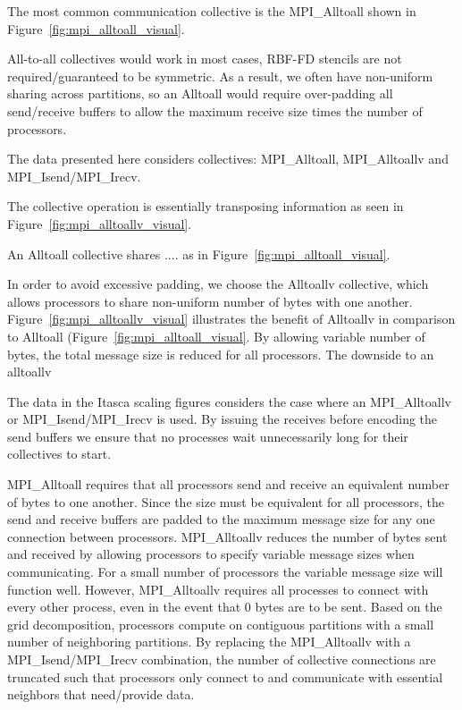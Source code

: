 \documentclass{report}
\begin{document}
The most common communication collective is the MPI\_Alltoall shown in Figure~\ref{fig:mpi_alltoall_visual}. 

All-to-all collectives would work in most cases, RBF-FD stencils are not required/guaranteed to be symmetric. As a result, we often have non-uniform sharing across partitions, so an Alltoall would require over-padding all send/receive buffers to allow the maximum receive size times the number of processors. 



The data presented here considers collectives: MPI\_Alltoall, MPI\_Alltoallv and MPI\_Isend/MPI\_Irecv. 

The collective operation is essentially transposing information as seen in Figure~\ref{fig:mpi_alltoallv_visual}. 

An Alltoall collective shares .... as in Figure~\ref{fig:mpi_alltoall_visual}.

In order to avoid excessive padding, we choose the Alltoallv collective, which allows processors to share non-uniform number of bytes with one another. Figure~\ref{fig:mpi_alltoallv_visual} illustrates the benefit of Alltoallv in comparison to Alltoall (Figure~\ref{fig:mpi_alltoall_visual}. By allowing variable number of bytes, the total message size is reduced for all processors. The downside to an alltoallv




The data in the Itasca scaling figures considers the case where an MPI\_Alltoallv or MPI\_Isend/MPI\_Irecv is used. By issuing the receives before encoding the send buffers we ensure that no processes wait unnecessarily long for their collectives to start.



MPI\_Alltoall requires that all processors send and receive an equivalent number of bytes to one another. Since the size must be equivalent for all processors, the send and receive buffers are padded to the maximum message size for any one connection between processors. MPI\_Alltoallv reduces the number of bytes sent and received by allowing processors to specify variable message sizes when communicating. For a small number of processors the variable message size will function well. However, MPI\_Alltoallv requires all processes to connect with every other process, even in the event that 0 bytes are to be sent. Based on the grid decomposition, processors compute on contiguous partitions with a small number of neighboring partitions. By replacing the MPI\_Alltoallv with a MPI\_Isend/MPI\_Irecv combination, the number of collective connections are truncated such that processors only connect to and communicate with essential neighbors that need/provide data. 
\end{document}
